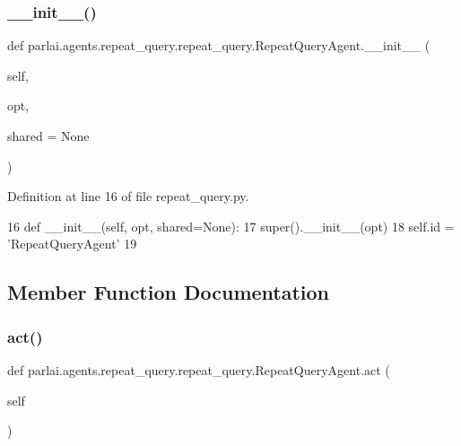 \subsubsection{\texorpdfstring{\+\_\+\+\_\+init\+\_\+\+\_\+()}{\_\_init\_\_()}}
{\footnotesize\ttfamily def parlai.\+agents.\+repeat\+\_\+query.\+repeat\+\_\+query.\+Repeat\+Query\+Agent.\+\_\+\+\_\+init\+\_\+\+\_\+ (\begin{DoxyParamCaption}\item[{}]{self,  }\item[{}]{opt,  }\item[{}]{shared = {\ttfamily None} }\end{DoxyParamCaption})}



Definition at line 16 of file repeat\+\_\+query.\+py.


\begin{DoxyCode}
16     \textcolor{keyword}{def }\_\_init\_\_(self, opt, shared=None):
17         super().\_\_init\_\_(opt)
18         self.id = \textcolor{stringliteral}{'RepeatQueryAgent'}
19 
\end{DoxyCode}


\subsection{Member Function Documentation}
\mbox{\label{classparlai_1_1agents_1_1repeat__query_1_1repeat__query_1_1RepeatQueryAgent_a7db5db4eda3e033a9022a4f4fe74419b}} 
\subsubsection{\texorpdfstring{act()}{act()}}
{\footnotesize\ttfamily def parlai.\+agents.\+repeat\+\_\+query.\+repeat\+\_\+query.\+Repeat\+Query\+Agent.\+act (\begin{DoxyParamCaption}\item[{}]{self }\end{DoxyParamCaption})}



